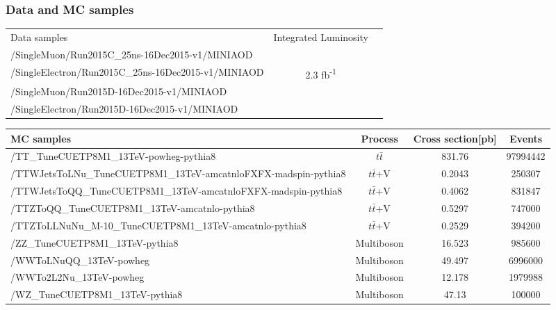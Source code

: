\documentclass{beamer}
\begin{document}
\begin{frame}
\frametitle{Data and MC samples}
    \begin{table}[t]
 \vspace{-2.5pt}
      \setlength{\tabcolsep}{1.0pt}
      \tiny
          \begin{tabular}{!{\color{purple}\vrule}l!{\color{purple}\vrule}c!{\color{purple}\vrule}c!{\color{purple}\vrule}}
\hline
\toprule
Data samples &  Integrated Luminosity\\
\hline %
\toprule
/SingleMuon/Run2015C\_25ns-16Dec2015-v1/MINIAOD & {}\\
/SingleElectron/Run2015C\_25ns-16Dec2015-v1/MINIAOD & 2.3 fb\textsuperscript{-1}\\
/SingleMuon/Run2015D-16Dec2015-v1/MINIAOD & {}\\
/SingleElectron/Run2015D-16Dec2015-v1/MINIAOD & {}\\
\toprule
\end{tabular}
\end{table}
    \begin{table}[t]
 \vspace{-8.5pt}
      \setlength{\tabcolsep}{1.0pt}
       \tiny
          \begin{tabular}{!{\color{purple}\vrule}l!{\color{purple}\vrule}c!{\color{purple}\vrule}c!{\color{purple}\vrule}c!{\color{purple}\vrule}}%
          \hline
           \toprule
MC samples &  Process & Cross section[pb] & Events\\
\toprule
\tiny
/TT\_TuneCUETP8M1\_13TeV-powheg-pythia8 & $t\bar{t}$ & 831.76 & 97994442\\
/TTWJetsToLNu\_TuneCUETP8M1\_13TeV-amcatnloFXFX-madspin-pythia8 & $t\bar{t}$+V & 0.2043 & 250307\\
/TTWJetsToQQ\_TuneCUETP8M1\_13TeV-amcatnloFXFX-madspin-pythia8 & $t\bar{t}$+V & 0.4062 & 831847\\
/TTZToQQ\_TuneCUETP8M1\_13TeV-amcatnlo-pythia8 & $t\bar{t}$+V & 0.5297 & 747000\\
/TTZToLLNuNu\_M-10\_TuneCUETP8M1\_13TeV-amcatnlo-pythia8 & $t\bar{t}$+V & 0.2529 & 394200\\
/ZZ\_TuneCUETP8M1\_13TeV-pythia8 & Multiboson & 16.523 & 985600\\
/WWToLNuQQ\_13TeV-powheg & Multiboson & 49.497 & 6996000\\
/WWTo2L2Nu\_13TeV-powheg & Multiboson & 12.178 & 1979988\\
/WZ\_TuneCUETP8M1\_13TeV-pythia8 & Multiboson & 47.13 & 100000\\

\end{tabular}
\end{table}
\end{frame}
\end{document}
